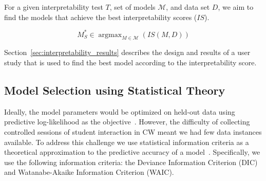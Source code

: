 \documentclass[letterpaper]{article} %
\newcommand{\citename}[1]{\citeauthor{#1}~\shortcite{#1}}
\DeclareMathOperator{\argmax}{argmax}
\newcommand{\kibitz}[2]{\ifnum\Comments=1{\textcolor{#1}{#2}}\fi}
\newcommand{\nh}[1]{\kibitz{blue}{[NH:#1]}}
\begin{document}
For a given interpretability test $T$,  set of models $\mathcal{M}$, and data set $D$, we aim to find the models that achieve the best interpretability scores ($IS$).
 
\begin{equation}
    \label{eq:model_int_score}
    M^*_S \in \argmax_{M \in \mathcal{M}}(IS(M, D))
\end{equation}

Section~\ref{sec:interpretability_results} describes the design and results of a  user study that is 
used to find the best model according to the interpretability score.




\subsection{Model Selection using Statistical Theory}
\label{sec:baseline}

Ideally, the model parameters would be optimized on held-out data using predictive log-likelihood as the objective~\cite{chang2009reading}. 
However, the difficulty of collecting controlled sessions of student interaction in CW meant we had few data instances available. 
To address this challenge we use  statistical information criteria as a theoretical approximation to the predictive accuracy of a model~\cite{gelman2013bayesian}. Specifically, we use the following information criteria: 
the {Deviance Information Criterion (DIC)} and {Watanabe-Akaike Information Criterion (WAIC)}.
\end{document}
